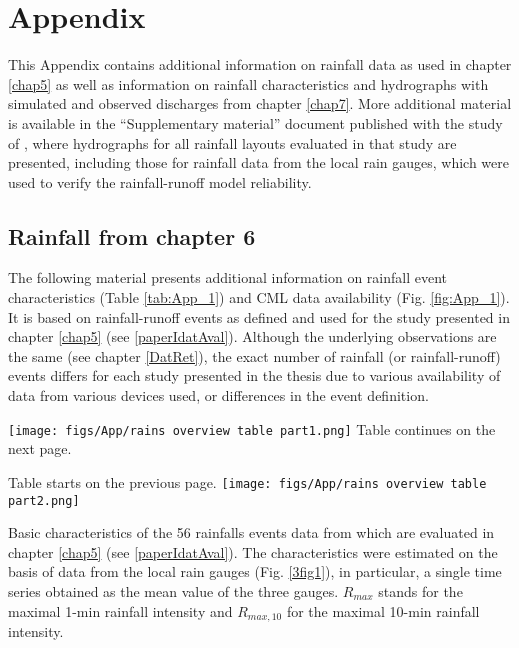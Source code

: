 \documentclass{ctuthesis}\usepackage[]{graphicx}\usepackage[]{color}
\begin{document}
        


\setcounter{chapter}{10}
\renewcommand{\thechapter}{A}

\chapter*{Appendix}    \label{Append}

This Appendix contains additional information on rainfall data as used in chapter \ref{chap5} as well as information on rainfall characteristics and hydrographs with simulated and observed discharges from chapter \ref{chap7}. More additional material is available in the \enquote{Supplementary material} document published with the study of \cite[][chapter  \ref{chap5}]{pastorekCommercialMicrowaveLinks2019}, where hydrographs for all rainfall layouts evaluated in that study are presented, including those for rainfall data from the local rain gauges, which were used to verify the rainfall-runoff model reliability.

\section{Rainfall from chapter 6} 

The following material presents additional information on  rainfall event characteristics (Table \ref{tab:App_1}) and CML data availability (Fig. \ref{fig:App_1}). It is based on rainfall-runoff events as defined and used for the study presented in chapter \ref{chap5} (see \ref{paperIdatAval}). Although the underlying observations are the same (see chapter \ref{DatRet}), the exact number of rainfall (or rainfall-runoff) events differs for each study presented in the thesis due to various availability of data from various devices used, or differences in the event definition. 


\FloatBarrier

\begin{table}[h]
\begin{center}
\texttt{[image: figs/App/rains overview table part1.png]}
Table continues on the next page.
\end{center}
\end{table}

\FloatBarrier

\begin{table}[h]
\begin{center}
Table starts on the previous page.
\texttt{[image: figs/App/rains overview table part2.png]}
\caption{Basic characteristics of the 56 rainfalls events data from which are evaluated in chapter \ref{chap5} (see \ref{paperIdatAval}). The characteristics were estimated on the basis of data from the local rain gauges (Fig. \ref{3fig1}), in particular, a single time series obtained as the mean value of the three gauges. $R_{max}$ stands for the maximal 1-min rainfall intensity and $R_{max,10}$ for the maximal 10-min rainfall intensity.} 
\label{tab:App_1}
\end{center}
\end{table}
\end{document}
